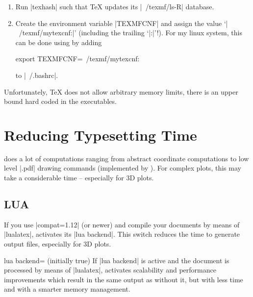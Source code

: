 {\begin{enumerate}
\begin{codeexample}[code only]
\end{codeexample}
    \item Run |texhash| such that \TeX{} updates its |~/texmf/ls-R| database.
    \item Create the environment variable |TEXMFCNF| and assign the value
        `|~/texmf/mytexcnf:|' (including the trailing `|:|'!). For my linux
        system, this can be done using by adding
\begin{codeexample}
export TEXMFCNF=~/texmf/mytexcnf:
\end{codeexample}
        to |~/.bashrc|.
\end{enumerate}

Unfortunately, \TeX{} does not allow arbitrary memory limits, there is an upper
bound hard coded in the executables.


\section[faster]{Reducing Typesetting Time}

\PGFPlots{} does a lot of computations ranging from abstract coordinate
computations to low level |.pdf| drawing commands (implemented by \PGF{}). For
complex plots, this may take a considerable time -- especially for 3D plots.


\subsection{LUA}

If you use |compat=1.12| (or newer) and compile your documents by means of
|lualatex|, \PGFPlots{} activates its |lua backend|. This switch reduces the
time to generate output files, especially for 3D plots.

\begin{pgfplotskey}{lua backend= (initially true)}
    If |lua backend| is active and the document is processed by means of
    |lualatex|, \PGFPlots{} activates scalability and performance improvements
    which result in the same output as without it, but with less time and with
    a smarter memory management.


\end{pgfplotskey}}
